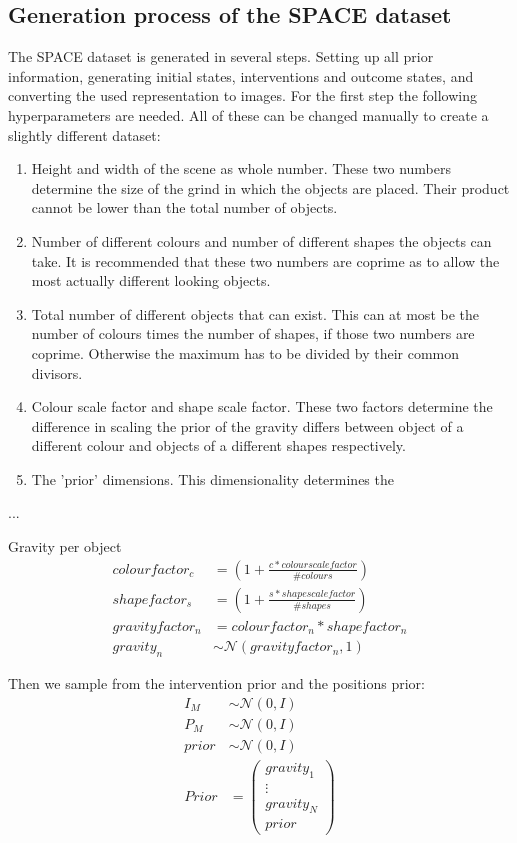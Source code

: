 \documentclass{report}
\newcommand{\Norm}{\mathcal{N}}
\begin{document}
\begin{appendices}
\chapter*{Generation process of the SPACE dataset}
The SPACE dataset is generated in several steps. Setting up all prior information, generating initial states, interventions and outcome states, and converting the used representation to images. For the first step the following hyperparameters are needed. All of these can be changed manually to create a slightly different dataset:
\begin{enumerate}
    \item Height and width of the scene as whole number. These two numbers determine the size of the grind in which the objects are placed. Their product cannot be lower than the total number of objects.
    \item Number of different colours and number of different shapes the objects can take. It is recommended that these two numbers are coprime as to allow the most actually different looking objects.
    \item Total number of different objects that can exist. This can at most be the number of colours times the number of shapes, if those two numbers are coprime. Otherwise the maximum has to be divided by their common divisors.
    \item Colour scale factor and shape scale factor. These two factors determine the difference in scaling the prior of the gravity differs between object of a different colour and objects of a different shapes respectively.
    \item The 'prior' dimensions. This dimensionality determines the 
\end{enumerate}

...

Gravity per object
\begin{align}
    colour factor_c &= \left(1 + \frac{c * colour scale factor}{\# colours} \right)\\
    shape factor_s &= \left(1 + \frac{s * shape scale factor}{\#shapes}\right) \\
    gravity factor_n &= colour factor_n * shape factor_n \\
    gravity_n &\sim \Norm(gravity factor_n, 1)
\end{align}

Then we sample from the intervention prior and the positions prior:
\begin{align}
    I_M &\sim \Norm(0, I)\\
    P_M &\sim \Norm(0, I)\\
    prior &\sim \Norm(0, I)\\
    Prior &= \begin{pmatrix}gravity_1 \\ \vdots\\gravity_N \\ prior\end{pmatrix}\\
\end{align}


\end{appendices}
\end{document}
